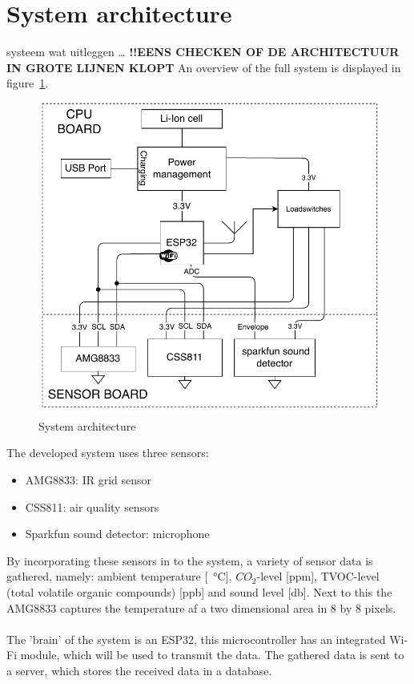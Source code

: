 \documentclass[11pt,a4paper]{article}
\begin{document}
\section{System architecture}
systeem wat uitleggen \dots
\textbf{!!EENS CHECKEN OF DE ARCHITECTUUR IN GROTE LIJNEN KLOPT}
An overview of the full system is displayed in figure~\ref{fig:architecture}.
\begin{figure}[H]
	\centering
	\includegraphics[width=1.0\linewidth]{architecture.pdf}
	\caption{System architecture}
	\label{fig:architecture}
\end{figure}
The developed system uses three sensors: 
\begin{itemize}
	\item AMG8833: IR grid sensor
	\item CSS811: air quality sensors
	\item Sparkfun sound detector: microphone
\end{itemize}
By incorporating these sensors in to the system, a variety of sensor data is gathered, namely: ambient temperature [\SI{}{\celsius}], $CO_2$-level [ppm], TVOC-level (total volatile organic compounds) [ppb] and sound level [db]. Next to this the AMG8833 captures the temperature af a two dimensional area in 8 by 8 pixels. 
\\ \\
The 'brain' of the system is an ESP32, this microcontroller has an integrated Wi-Fi module, which will be used to transmit the data. The gathered data is sent to a server, which stores the received data in a database. 
\end{document}
